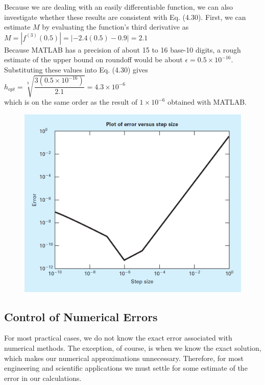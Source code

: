 \documentclass[../main.tex]{subfiles}
\begin{document}
\begin{example}
    Because we are dealing with an easily differentiable function, we can also investigate
    whether these results are consistent with Eq. (4.30). First, we can estimate $M$ by evaluating
    the function's third derivative as\\

    $M = \left\lvert f^{(3)}(0.5) \right\rvert =  \left\lvert -2.4(0.5) - 0.9 \right\rvert = 2.1$\\

    \noindent
    Because MATLAB has a precision of about 15 to 16 base-10 digits, a rough estimate of the
    upper bound on roundoff would be about $\epsilon = 0.5 \times 10^{-16}$. Substituting these values into
    Eq. (4.30) gives\\

    $h_{opt} = \sqrt[3]{\dfrac{3(0.5\times 10^{-16})}{2.1}} = 4.3\times 10^{-6}$\\

    \noindent
    which is on the same order as the result of $1\times 10^{-6}$ obtained with MATLAB.

    \begin{figure}[h]
        \includegraphics[width=0.75\linewidth]{./images/fig_4_12}
    \end{figure}
\end{example}
\newpage

\subsection{Control of Numerical Errors}
\noindent
For most practical cases, we do not know the exact error associated with numerical methods.
The exception, of course, is when we know the exact solution, which makes our numerical
approximations unnecessary. Therefore, for most engineering and scientific applications we
must settle for some estimate of the error in our calculations.
\end{document}
